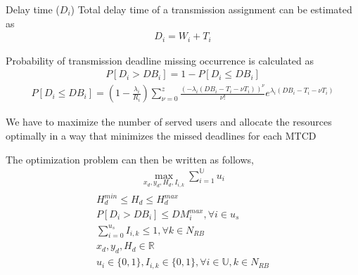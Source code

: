 \documentclass{beamer}
\begin{document}
\begin{frame}{}
    \begin{block}{Delay time ($D_i$)}
    Total delay time of a transmission assignment can be estimated as
    \begin{align}
        D_i=W_i+T_i
    \end{align}
    \end{block}
    \begin{block}{}
    Probability of transmission deadline missing occurrence is calculated as
    \begin{align}
        P[D_i>DB_i]=1-P[D_i\leq DB_i]
    \end{align}
    \begin{align}
        P[D_i \leq DB_i] = \left(1 - \frac{\lambda_i}{R_i}\right)\sum\limits_{\nu = 0}^{z}\frac{\left(-\lambda_i(DB_i - T_i - \nu T_i)\right)^\nu}{\nu!}e^{\lambda_i(DB_i - T_i - \nu T_i)}
    \end{align}
    \end{block}
\end{frame}
\begin{frame}{}
    \begin{block}{}
    We have to maximize the number of served users and allocate the resources optimally in a way that minimizes the missed deadlines for each MTCD
    
    The optimization problem can then be written as follows,
    \begin{align}\label{eq1}
        \max\limits_{x_d, y_d, H_d, I_{i, k}}\sum\limits_{i=1}^{\mathbb{U}} u_i
    \end{align}
    \begin{align}
        H_d^{min} \leq H_d \leq H_d^{max}\\
        P[D_i > DB_i] \leq {DM}_i^{max}, \forall i \in u_s\\
        \sum\limits_{i=0}^{u_s}I_{i,k}\leq 1, \forall k \in N_{RB}\\
        x_d, y_d, H_d \in \mathbb{R}\\
        u_i\in\{0,1\}, I_{i,k}\in\{0,1\}, \forall i\in \mathbb{U}, k \in N_{RB}
    \end{align}
    \end{block}
\end{frame}
\end{document}
